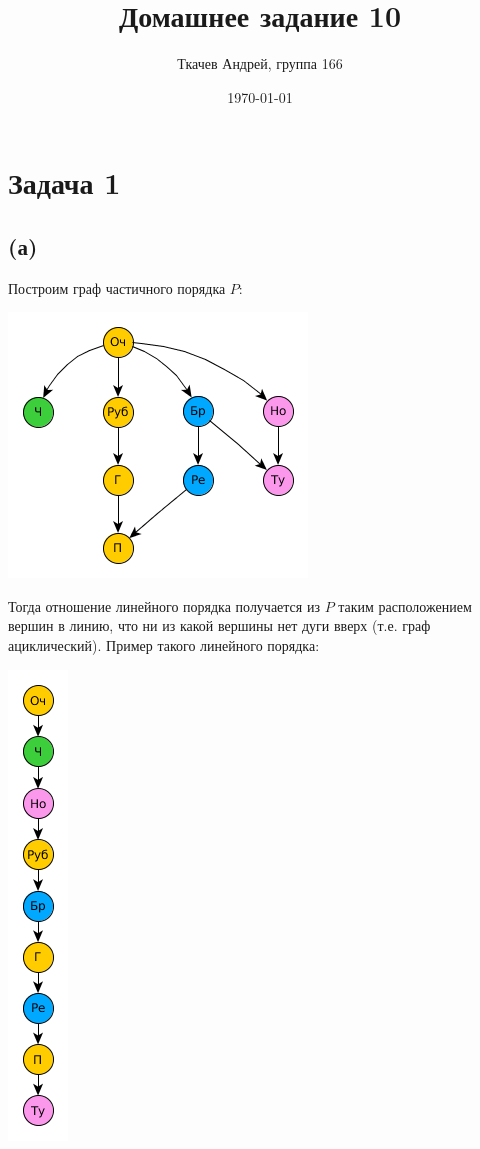 \documentclass{article}
\title{Домашнее задание 10}
\author{Ткачев Андрей, группа 166}
\date{\today}
\begin{document}
	\maketitle
	\section {Задача 1}
	\subsection{(а)}
	
	Построим граф частичного порядка $P$:
	
	\begin{center}
		\includegraphics[scale=0.5]{1_1}
	\end{center}
	
	Тогда отношение линейного порядка получается из $P$ таким расположением вершин в линию, что ни из какой вершины нет дуги вверх (т.е. граф ациклический). Пример такого линейного порядка:
	
	\begin{center}
		\includegraphics[scale=0.5]{1_2}
	\end{center}
	
\end{document}
